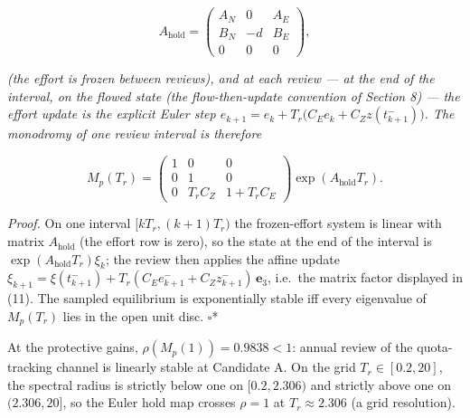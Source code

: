 \documentclass[11pt]{article}
\begin{document}
\[A_{\mathrm{hold}} = \begin{pmatrix} A_N & 0 & A_E \\ B_N & -d & B_E \\ 0 & 0 & 0 \end{pmatrix},\]

\emph{(the effort is frozen between reviews), and at each review --- at
the end of the interval, on the flowed state (the flow-then-update
convention of Section 8) --- the effort update is the explicit Euler
step \(e_{k+1} = e_k + T_r\big(C_E e_k + C_Z z(t_{k+1}^-)\big)\). The
monodromy of one review interval is therefore}

\[M_p(T_r) = \begin{pmatrix} 1 & 0 & 0 \\ 0 & 1 & 0 \\ 0 & T_r C_Z & 1 + T_r C_E \end{pmatrix} \exp(A_{\mathrm{hold}} T_r). \tag{11}\]

\emph{Proof.} On one interval \([kT_r, (k+1)T_r)\) the frozen-effort
system is linear with matrix \(A_{\mathrm{hold}}\) (the effort row is
zero), so the state at the end of the interval is
\(\exp(A_{\mathrm{hold}}T_r)\xi_k\); the review then applies the affine
update
\(\xi_{k+1} = \xi(t_{k+1}^-) + T_r(C_E e_{k+1}^- + C_Z z_{k+1}^-)\,\mathbf{e}_3\),
i.e.~the matrix factor displayed in (11). The sampled equilibrium is
exponentially stable iff every eigenvalue of \(M_p(T_r)\) lies in the
open unit disc. \ensuremath{\square}*

At the protective gains, \(\rho(M_p(1)) = 0.9838 < 1\): annual review of
the quota-tracking channel is linearly stable at Candidate A. On the
grid \(T_r \in [0.2, 20]\), the spectral radius is strictly below one on
\([0.2, 2.306)\) and strictly above one on \((2.306, 20]\), so the Euler
hold map crosses \(\rho = 1\) at \(T_r \approx 2.306\) (a grid
resolution).
\end{document}
